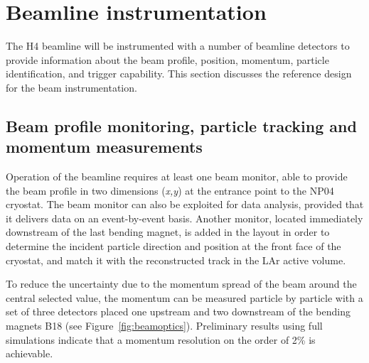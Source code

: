 \section{Beamline instrumentation}
\label{sec:beaminstruments}

The H4 beamline will be instrumented with a number of beamline detectors to provide information 
 about the beam profile, position, momentum, particle identification, and trigger capability. 
This section discusses the reference design for the beam instrumentation. 

\subsection{Beam profile monitoring, particle tracking and momentum measurements}

Operation of the beamline requires at least one beam monitor, able to provide the beam profile in two dimensions ({\it x,y}) at the entrance point to the NP04 cryostat.   The beam monitor can also be exploited for data analysis, provided that it delivers data on an event-by-event basis. Another monitor, located immediately downstream of the last bending magnet, is added in the layout  in order to determine the incident particle  direction and position at the front face of the cryostat, and match it with the reconstructed track in the LAr active volume.

To reduce the uncertainty due to the momentum spread of the beam around the central selected value, the momentum can be measured particle by particle
with a set of three detectors placed one upstream and two downstream of the bending magnets B18 (see Figure~\ref{fig:beamoptics}).  
Preliminary results using full simulations indicate that a momentum resolution on the order of  2\% is achievable. 
%
